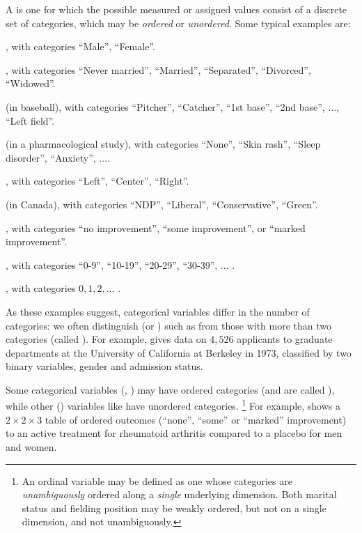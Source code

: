 \documentclass[10pt,krantz2]{krantz}\usepackage[]{graphicx}\usepackage[]{color}
\begin{document}
A  is one for which the possible measured
or assigned values
consist of a discrete set of categories, which may be \emph{ordered} or
\emph{unordered}.
Some typical examples are:
\begin{itemize*}
\item {}, with categories ``Male'', ``Female''.
\item {}, with categories ``Never married'', ``Married'',
``Separated'', ``Divorced'', ``Widowed''.
\item {} (in baseball), with categories
``Pitcher'', ``Catcher'', ``1st base'', ``2nd base'',  $\dots$, ``Left field''.
\item {} (in a pharmacological study), with categories
``None'', ``Skin rash'', ``Sleep disorder'', ``Anxiety'', $\dots$.
\item {}, with categories ``Left'', ``Center'', ``Right''.
\item {} (in Canada), with categories ``NDP'', ``Liberal'', ``Conservative'', ``Green''.
\item {}, with categories ``no improvement'', ``some
improvement'', or ``marked improvement''.
\item {}, with categories ``0-9'', ``10-19'', ``20-29'', ``30-39'',
$\dots$ .
\item {}, with categories $0, 1, 2, \dots$ .
\end{itemize*}

As these examples suggest, categorical variables differ in the number of
categories: we often distinguish
 (or ) such as 
from those with more than two categories (called ).
For example,  gives data on $4,526$ applicants
to graduate departments at the University of California at Berkeley
in 1973, classified by two binary variables, gender and admission status.


Some categorical variables (, )
may have ordered categories (and are called ),
while other () variables like 
have unordered categories.%
\footnote{An ordinal variable may be defined as one whose categories are
\emph{unambiguously} ordered along a \emph{single} underlying dimension.
Both marital status and fielding position may be weakly ordered, but
not on a single dimension, and not unambiguously.}
For example,  shows a $2 \times 2 \times 3$ table of
ordered outcomes (``none'', ``some'' or ``marked'' improvement)
to an active treatment for rheumatoid
arthritis compared to a placebo for men and women.

\end{document}
